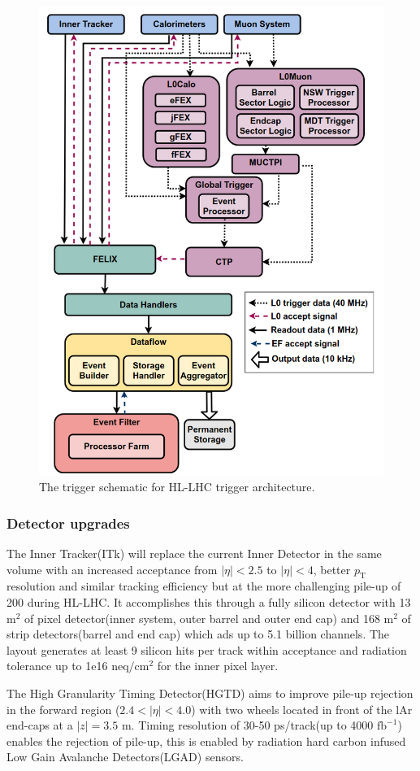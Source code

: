\begin{figure}[t!]
    \centering
    \includegraphics[width=0.7\linewidth]{images/atlas/ATLASHL-LHCTriggerSchematic.png}
    \caption{The trigger schematic for HL-LHC trigger architecture\cite{ATLAS:TDAQ-TDR-EF}.}
    \label{fig:TriggerHL-LHC}
\end{figure}

\subsubsection{Detector upgrades}

The Inner Tracker(ITk)\cite{CERN-LHCC-2017-021,CERN-LHCC-2017-005} will replace the current Inner Detector in the same volume with an increased acceptance from $|\eta|<2.5$ to $|\eta|<4$, better $p_\text{T}$ resolution and similar tracking efficiency but at the more challenging pile-up of 200 during HL-LHC. It accomplishes this through a fully silicon detector with 13 $\text{m}^2$ of pixel detector(inner system, outer barrel and outer end cap) and 168 $\text{m}^2$ of strip detectors(barrel and end cap) which ads up to 5.1 billion channels. The layout generates at least 9 silicon hits per track within acceptance and radiation tolerance up to 1e16 neq$/\text{cm}^2$ for the inner pixel layer.

The High Granularity Timing Detector(HGTD)\cite{CERN-LHCC-2020-007} aims to improve pile-up rejection in the forward region ($2.4<|\eta|<4.0$) with two wheels located in front of the lAr end-caps at a $|z|= 3.5$ m. Timing resolution of 30-50 ps/track(up to 4000 $\text{fb}^{-1}$) enables the rejection of pile-up, this is enabled by radiation hard carbon infused Low Gain Avalanche Detectors(LGAD) sensors.


